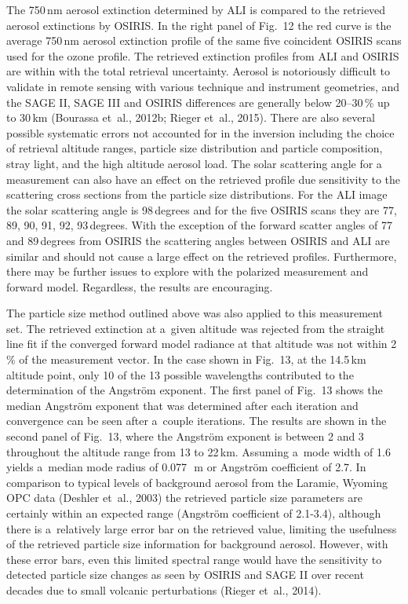 \documentclass[amtd, online, hvmath]{copernicus}
\begin{document}
The 750\,\unit{nm} aerosol extinction determined by ALI is compared to the retrieved aerosol extinctions by OSIRIS. In the right panel of Fig.~12 the red curve is the average 750\,\unit{nm} aerosol extinction profile of the
same five coincident OSIRIS scans used for the ozone profile. The
retrieved extinction profiles from ALI and OSIRIS are within with the
total retrieval uncertainty. Aerosol is notoriously
difficult to validate in remote sensing with various technique and
instrument geometries, and the SAGE II, SAGE III and OSIRIS
differences are generally below 20--30\,{\%} up to 30\,\unit{km}
(Bourassa et~al., 2012b; Rieger et~al., 2015). There are also several possible systematic errors not
accounted for in the inversion including the choice of retrieval
altitude ranges, particle size distribution and  particle composition, stray
light, and the high altitude aerosol load. The solar scattering angle for a measurement can also have an effect on the retrieved profile due sensitivity to the scattering cross sections from the particle size distributions. For the ALI image the solar scattering angle is 98\,degrees and for the five OSIRIS scans they are 77, 89, 90, 91, 92, 93\,degrees. With the exception of the forward scatter angles of 77 and 89\,degrees from OSIRIS the scattering angles between OSIRIS and ALI are similar and should not cause a large effect on the retrieved profiles. Furthermore, there may be
further issues to explore with the polarized measurement and forward
model. Regardless, the results are encouraging.

The particle size method outlined above was also applied to this
measurement set. The retrieved extinction at a~given altitude was
rejected from the straight line fit if the converged forward model
radiance at that altitude was not within 2\,{\%} of the measurement
vector. In the case shown in Fig.~13, at the 14.5\,\unit{km} altitude
point, only 10 of the 13 possible wavelengths contributed to the
determination of the Angstr\"{o}m exponent. The first panel of Fig.~13
shows the median Angstr\"{o}m exponent that was determined after each
iteration and convergence can be seen after a~couple iterations. The
results are shown in the second panel of Fig.~13, where the
Angstr\"{o}m exponent is between 2 and 3 throughout the altitude range
from 13 to 22\,\unit{km}. Assuming a~mode width of 1.6 yields a~median
mode radius of 0.077\,\unit{{\mu}m} or Angstr\"{o}m coefficient of 2.7. In comparison to typical levels
of background aerosol from the Laramie, Wyoming OPC data (Deshler
et~al., 2003) the retrieved particle size parameters are certainly
within an expected range (Angstr\"{o}m coefficient of 2.1-3.4), although there is a~relatively large error
bar on the retrieved value, limiting the usefulness of the retrieved
particle size information for background aerosol. However, with these
error bars, even this limited spectral range would have the
sensitivity to detected particle size changes as seen by OSIRIS and
SAGE II over recent decades due to small volcanic perturbations
(Rieger et~al., 2014).
\end{document}
